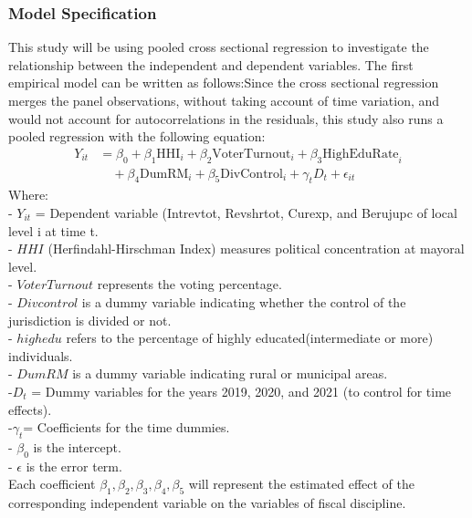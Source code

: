 \subsubsection{Model Specification}
This study will be using  pooled cross sectional regression to investigate the relationship between the independent and dependent variables. The first empirical model can be written as follows:Since the cross sectional regression merges the panel observations, without taking account of time variation, and would not account for autocorrelations in the residuals, this study also runs a pooled regression with the following equation:
\begin{align}
Y_{it} & = \beta_0 + \beta_1 \text{HHI}_i + \beta_2 \text{VoterTurnout}_i + \beta_3 \text{HighEduRate}_i \nonumber \\ &\quad + \beta_4 \text{DumRM}_i + \beta_5 \text{DivControl}_i + \gamma_t D_t + \epsilon_{it} 
\end{align}
Where:\\
- \(Y_{it}\) = Dependent variable (Intrevtot, Revshrtot, Curexp, and Berujupc of local level  i at time  t.\\
- \(HHI\) (Herfindahl-Hirschman Index) measures political concentration at mayoral level.\\
- \(VoterTurnout\) represents the voting percentage.\\
- \(Divcontrol\) is a dummy variable indicating whether the control of the jurisdiction is divided or not.\\
- \(highedu\) refers to the percentage of highly educated(intermediate or more) individuals.\\
- \(DumRM\) is a dummy variable indicating rural or municipal areas.\\
-\(D_t\) = Dummy variables for the years 2019, 2020, and 2021 (to control for time effects).\\
-\(\gamma_t \)= Coefficients for the time dummies.\\
- \(\beta_0\) is the intercept.\\
- \(\epsilon\) is the error term.\\
Each coefficient \(\beta_1, \beta_2, \beta_3, \beta_4, \beta_5\) will represent the estimated effect of the corresponding independent variable on the variables of fiscal discipline.\\



